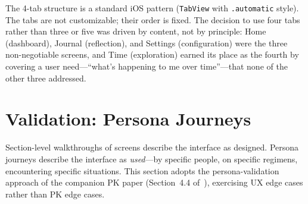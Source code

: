 \documentclass[11pt,a4paper]{article}
\newcommand{\code}[1]{\texttt{\small #1}}
\begin{document}
The 4-tab structure is a standard iOS pattern (\code{TabView} with
\code{.automatic} style). The tabs are not customizable; their order is
fixed. The decision to use four tabs rather than three or five was driven
by content, not by principle: Home (dashboard), Journal (reflection), and
Settings (configuration) were the three non-negotiable screens, and Time
(exploration) earned its place as the fourth by covering a user need---``what's
happening to me over time''---that none of the other three addressed.

\section{Validation: Persona Journeys}
\label{sec:personas}

Section-level walkthroughs of screens describe the interface as designed.
Persona journeys describe the interface as \emph{used}---by specific
people, on specific regimens, encountering specific situations. This
section adopts the persona-validation approach of the companion PK
paper (Section~4.4 of~\cite{xtpk}), exercising UX edge cases rather
than PK edge cases.
\end{document}
